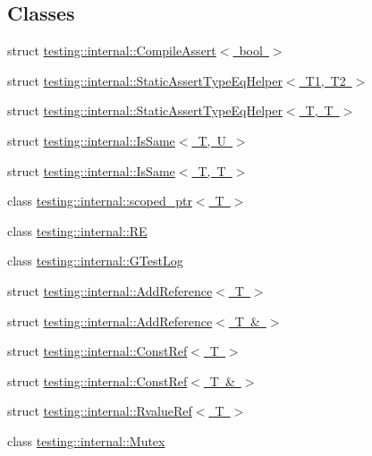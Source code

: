 \subsection*{Classes}
\begin{DoxyCompactItemize}
\item 
struct \mbox{\hyperlink{structtesting_1_1internal_1_1CompileAssert}{testing\+::internal\+::\+Compile\+Assert$<$ bool $>$}}
\item 
struct \mbox{\hyperlink{structtesting_1_1internal_1_1StaticAssertTypeEqHelper}{testing\+::internal\+::\+Static\+Assert\+Type\+Eq\+Helper$<$ T1, T2 $>$}}
\item 
struct \mbox{\hyperlink{structtesting_1_1internal_1_1StaticAssertTypeEqHelper_3_01T_00_01T_01_4}{testing\+::internal\+::\+Static\+Assert\+Type\+Eq\+Helper$<$ T, T $>$}}
\item 
struct \mbox{\hyperlink{structtesting_1_1internal_1_1IsSame}{testing\+::internal\+::\+Is\+Same$<$ T, U $>$}}
\item 
struct \mbox{\hyperlink{structtesting_1_1internal_1_1IsSame_3_01T_00_01T_01_4}{testing\+::internal\+::\+Is\+Same$<$ T, T $>$}}
\item 
class \mbox{\hyperlink{classtesting_1_1internal_1_1scoped__ptr}{testing\+::internal\+::scoped\+\_\+ptr$<$ T $>$}}
\item 
class \mbox{\hyperlink{classtesting_1_1internal_1_1RE}{testing\+::internal\+::\+RE}}
\item 
class \mbox{\hyperlink{classtesting_1_1internal_1_1GTestLog}{testing\+::internal\+::\+G\+Test\+Log}}
\item 
struct \mbox{\hyperlink{structtesting_1_1internal_1_1AddReference}{testing\+::internal\+::\+Add\+Reference$<$ T $>$}}
\item 
struct \mbox{\hyperlink{structtesting_1_1internal_1_1AddReference_3_01T_01_6_01_4}{testing\+::internal\+::\+Add\+Reference$<$ T \& $>$}}
\item 
struct \mbox{\hyperlink{structtesting_1_1internal_1_1ConstRef}{testing\+::internal\+::\+Const\+Ref$<$ T $>$}}
\item 
struct \mbox{\hyperlink{structtesting_1_1internal_1_1ConstRef_3_01T_01_6_01_4}{testing\+::internal\+::\+Const\+Ref$<$ T \& $>$}}
\item 
struct \mbox{\hyperlink{structtesting_1_1internal_1_1RvalueRef}{testing\+::internal\+::\+Rvalue\+Ref$<$ T $>$}}
\item 
class \mbox{\hyperlink{classtesting_1_1internal_1_1Mutex}{testing\+::internal\+::\+Mutex}}
\item 

\end{DoxyCompactItemize}
